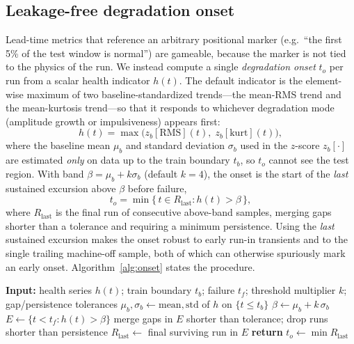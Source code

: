 \documentclass[journal]{IEEEtran}
\begin{document}
\subsection{Leakage-free degradation onset}
Lead-time metrics that reference an arbitrary positional marker (e.g.\ ``the
first 5\% of the test window is normal'') are gameable, because the marker is
not tied to the physics of the run. We instead compute a single
\emph{degradation onset} $t_o$ per run from a scalar health indicator $h(t)$.
The default indicator is the element-wise maximum of two baseline-standardized
trends---the mean-RMS trend and the mean-kurtosis trend---so that it responds to
whichever degradation mode (amplitude growth or impulsiveness) appears first:
\begin{equation}
h(t) = \max\!\big(z_b[\mathrm{RMS}](t),\; z_b[\mathrm{kurt}](t)\big),
\end{equation}
where the baseline mean $\mu_b$ and standard deviation $\sigma_b$ used in the
$z$-score $z_b[\cdot]$ are estimated \emph{only} on data up to the train
boundary $t_b$, so $t_o$ cannot see the test region. With band
$\beta = \mu_b + k\sigma_b$ (default $k{=}4$), the onset is the start of the
\emph{last} sustained excursion above $\beta$ before failure,
\begin{equation}
t_o = \min\{\, t \in R_{\mathrm{last}} : h(t) > \beta \,\},
\label{eq:onset}
\end{equation}
where $R_{\mathrm{last}}$ is the final run of consecutive above-band samples,
merging gaps shorter than a tolerance and requiring a minimum persistence. Using
the \emph{last} sustained excursion makes the onset robust to early run-in
transients and to the single trailing machine-off sample, both of which can
otherwise spuriously mark an early onset. Algorithm~\ref{alg:onset} states the
procedure.

\begin{algorithm}[t]
\caption{Leakage-free terminal degradation onset}
\label{alg:onset}
\begin{algorithmic}[1]
\State \textbf{Input:} health series $h(t)$; train boundary $t_b$; failure
$t_f$; threshold multiplier $k$; gap/persistence tolerances
\State $\mu_b,\sigma_b \gets \mathrm{mean},\mathrm{std}$ of $h$ on $\{t\le t_b\}$
\State $\beta \gets \mu_b + k\,\sigma_b$
\State $E \gets \{t < t_f : h(t) > \beta\}$ 
\State merge gaps in $E$ shorter than tolerance; drop runs shorter than
persistence
\State $R_{\mathrm{last}} \gets$ final surviving run in $E$
\State \textbf{return} $t_o \gets \min R_{\mathrm{last}}$
\end{algorithmic}
\end{algorithm}
\end{document}
